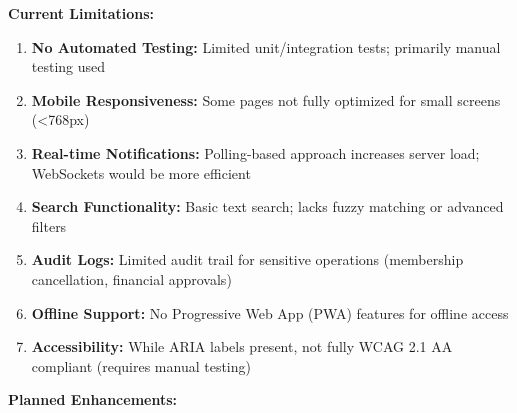 \documentclass[12pt,a4paper]{article}
\begin{document}
\textbf{Current Limitations:}

\begin{enumerate}[noitemsep]
  \item \textbf{No Automated Testing:} Limited unit/integration tests; primarily manual testing used
  \item \textbf{Mobile Responsiveness:} Some pages not fully optimized for small screens (<768px)
  \item \textbf{Real-time Notifications:} Polling-based approach increases server load; WebSockets would be more efficient
  \item \textbf{Search Functionality:} Basic text search; lacks fuzzy matching or advanced filters
  \item \textbf{Audit Logs:} Limited audit trail for sensitive operations (membership cancellation, financial approvals)
  \item \textbf{Offline Support:} No Progressive Web App (PWA) features for offline access
  \item \textbf{Accessibility:} While ARIA labels present, not fully WCAG 2.1 AA compliant (requires manual testing)
\end{enumerate}

\textbf{Planned Enhancements:}
\end{document}
